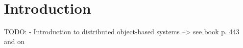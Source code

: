 \documentclass[Main]{subfiles}
\begin{document}
\chapter{Introduction}

TODO:
- Introduction to distributed object-based systems --> see book p. 443 and on
\end{document}
